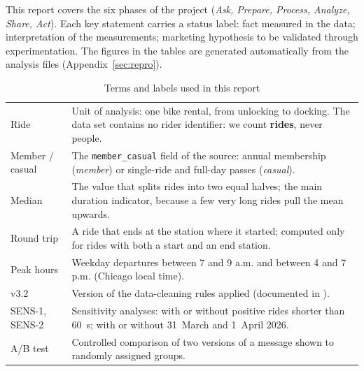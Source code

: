 
This report covers the six phases of the project (\emph{Ask, Prepare, Process, Analyze, Share, Act}).
Each key statement carries a status label: \Mes{} fact measured in the data;
\Int{} interpretation of the measurements; \Hyp{} marketing hypothesis to be validated through experimentation.
The figures in the tables are generated automatically from the analysis files (Appendix~\ref{sec:repro}).

\begin{table}[H]
\caption{Terms and labels used in this report}
\label{tab:terms}
\small
\begin{tabularx}{\linewidth}{L{3.3cm} Y}
\toprule
{} &  \\
\midrule
Ride & Unit of analysis: one bike rental, from unlocking to docking. The data set contains no rider identifier: we count \textbf{rides}, never people. \\
Member / casual & The \texttt{member\_casual} field of the source: annual membership (\emph{member}) or single-ride and full-day passes (\emph{casual}). \\
Median & The value that splits rides into two equal halves; the main duration indicator, because a few very long rides pull the mean upwards. \\
Round trip & A ride that ends at the station where it started; computed only for rides with both a start and an end station. \\
Peak hours & Weekday departures between 7 and 9 a.m. and between 4 and 7 p.m. (Chicago local time). \\
v3.2 & Version of the data-cleaning rules applied (documented in ). \\
SENS-1, SENS-2 & Sensitivity analyses: with or without positive rides shorter than 60~s; with or without 31~March and 1~April 2026. \\
A/B test & Controlled comparison of two versions of a message shown to randomly assigned groups. \\
\bottomrule
\end{tabularx}
\end{table}
